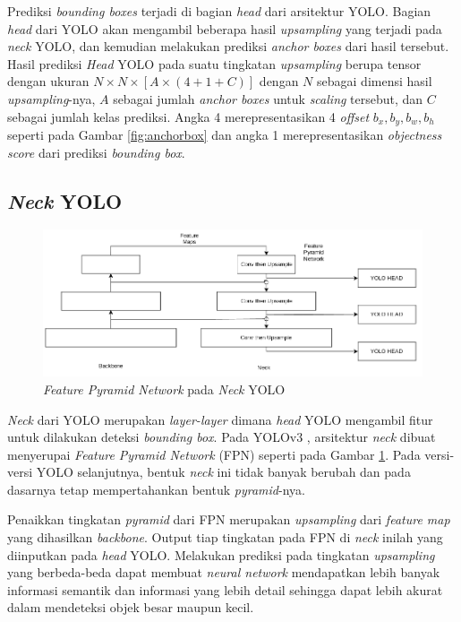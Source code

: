       Prediksi \emph{bounding boxes} terjadi di bagian \emph{head} dari arsitektur YOLO.
      Bagian \emph{head} dari YOLO akan mengambil beberapa hasil \emph{upsampling} yang terjadi pada \emph{neck} YOLO, dan kemudian melakukan prediksi \emph{anchor boxes} dari hasil tersebut.
      Hasil prediksi \emph{Head} YOLO pada suatu tingkatan \emph{upsampling} berupa tensor dengan ukuran $N\times N \times [A\times(4+1+C)]$ dengan $N$ sebagai dimensi hasil \emph{upsampling}-nya, $A$ sebagai jumlah \emph{anchor boxes} untuk \emph{scaling} tersebut, dan $C$ sebagai jumlah kelas prediksi.
      Angka 4 merepresentasikan 4 \emph{offset} $b_x, b_y, b_w, b_h$ seperti pada Gambar \ref{fig:anchorbox} dan angka 1 merepresentasikan \emph{objectness score} dari prediksi \emph{bounding box}.
  
    \subsection{\emph{Neck} YOLO}
  
      \begin{figure}[ht]
          \centering
          \includegraphics[scale=0.6]{pictures/yolo-architecture-rough.png}
          \caption{\emph{Feature Pyramid Network} pada \emph{Neck} YOLO}
          \label{fig:yolofpn}
      \end{figure}
  
      \emph{Neck} dari YOLO merupakan \emph{layer-layer} dimana \emph{head} YOLO mengambil fitur untuk dilakukan deteksi \emph{bounding box}.
      Pada YOLOv3 \textcite{yolov3}, arsitektur \emph{neck} dibuat menyerupai \emph{Feature Pyramid Network} (FPN) seperti pada Gambar \ref{fig:yolofpn}. 
      Pada versi-versi YOLO selanjutnya, bentuk \emph{neck} ini tidak banyak berubah dan pada dasarnya tetap mempertahankan bentuk \emph{pyramid}-nya.
  
      Penaikkan tingkatan \emph{pyramid} dari FPN merupakan \emph{upsampling} dari \emph{feature map} yang dihasilkan \emph{backbone}.
      Output tiap tingkatan pada FPN di \emph{neck} inilah yang diinputkan pada \emph{head} YOLO. 
      Melakukan prediksi pada tingkatan \emph{upsampling} yang berbeda-beda dapat membuat \emph{neural network} mendapatkan lebih banyak informasi semantik dan informasi yang lebih detail sehingga dapat lebih akurat dalam mendeteksi objek besar maupun kecil.
  
